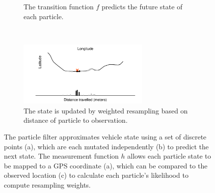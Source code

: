 \begin{figure}[p]
\begin{subfigure}[t]{0.9\textwidth}
        \caption{
            The transition function $f$ predicts the future state 
            of each particle.
        }
        \label{fig:pf_state_predict}
    \end{subfigure}\\
    \begin{subfigure}[t]{0.9\textwidth}
        \centering
        \includegraphics[width=0.7\textwidth]{figures/03_particle_filter_4.pdf}
        \caption{
            The state is updated by weighted resampling based on distance
            of particle to observation.
        }
        \label{fig:pf_state_predict2}
    \end{subfigure}
    \caption{
        The particle filter approximates vehicle state using a set of 
        discrete points (a), which are each mutated independently (b)
        to predict the next state.
        The measurement function $h$ allows each particle state
        to be mapped to a GPS coordinate (a),
        which can be compared to the observed location (c)
        to calculate each particle's likelihood to compute resampling weights.
    }
    \label{fig:pf_state}
\end{figure}

